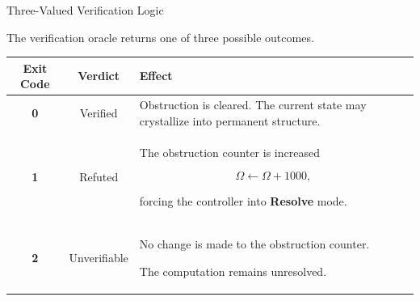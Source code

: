 \begin{mosbox}{Three-Valued Verification Logic}

\BodyFont

The verification oracle returns one of three possible outcomes.

\vspace{3mm}

\renewcommand{\arraystretch}{1.6}

\begin{center}

\begin{tabular}{|c|c|p{7.5cm}|}

\hline

\textbf{Exit Code}
&
\textbf{Verdict}
&
\textbf{Effect}

\\

\hline

\color{green!70!black}\textbf{0}

&
Verified

&
Obstruction is cleared.
The current state may crystallize into permanent structure.

\\

\hline

\color{red!80!black}\textbf{1}

&
Refuted

&
The obstruction counter is increased

\[
\Omega
\leftarrow
\Omega+1000,
\]

forcing the controller into
\textbf{Resolve} mode.

\\

\hline

\color{orange!90!black}\textbf{2}

&
Unverifiable

&
No change is made to the obstruction counter.

The computation remains unresolved.

\\

\hline

\end{tabular}

\end{center}

\end{mosbox}


